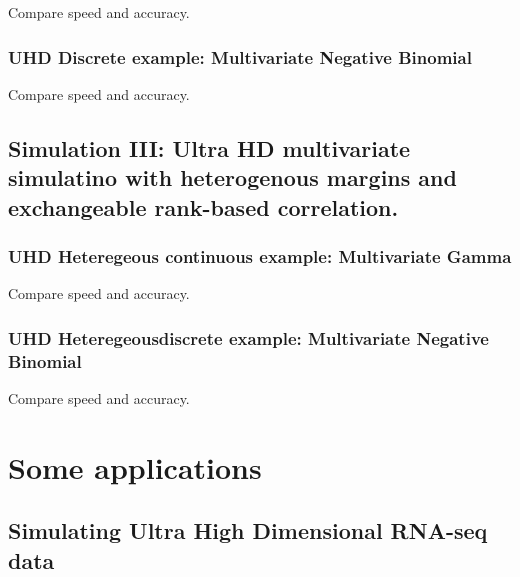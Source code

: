 \documentclass[
]{article}
\begin{document}
Compare speed and accuracy.

\hypertarget{uhd-discrete-example-multivariate-negative-binomial}{%
\subsubsection{UHD Discrete example: Multivariate Negative Binomial}\label{uhd-discrete-example-multivariate-negative-binomial}}

Compare speed and accuracy.

\hypertarget{simulation-iii-ultra-hd-multivariate-simulatino-with-heterogenous-margins-and-exchangeable-rank-based-correlation.}{%
\subsection{Simulation III: Ultra HD multivariate simulatino with heterogenous margins and exchangeable rank-based correlation.}\label{simulation-iii-ultra-hd-multivariate-simulatino-with-heterogenous-margins-and-exchangeable-rank-based-correlation.}}

\hypertarget{uhd-heteregeous-continuous-example-multivariate-gamma}{%
\subsubsection{UHD Heteregeous continuous example: Multivariate Gamma}\label{uhd-heteregeous-continuous-example-multivariate-gamma}}

Compare speed and accuracy.

\hypertarget{uhd-heteregeousdiscrete-example-multivariate-negative-binomial}{%
\subsubsection{UHD Heteregeousdiscrete example: Multivariate Negative Binomial}\label{uhd-heteregeousdiscrete-example-multivariate-negative-binomial}}

Compare speed and accuracy.

\hypertarget{some-applications}{%
\section{Some applications}\label{some-applications}}

\hypertarget{simulating-ultra-high-dimensional-rna-seq-data}{%
\subsection{Simulating Ultra High Dimensional RNA-seq data}\label{simulating-ultra-high-dimensional-rna-seq-data}}
\end{document}
